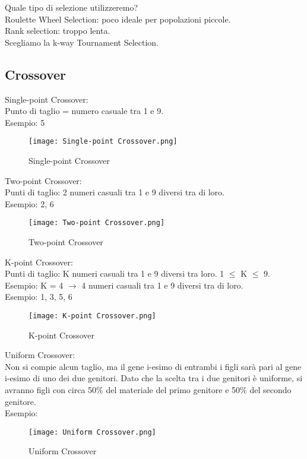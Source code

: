 \documentclass[10pt,a4paper]{article}
\begin{document}
    Quale tipo di selezione utilizzeremo?\\
    Roulette Wheel Selection: poco ideale per popolazioni piccole.\\
    Rank selection: troppo lenta.\\
    Scegliamo la k-way Tournament Selection.\\
    
    \subsection{Crossover}
    \label{Crossover}
    Single-point Crossover:\\
    Punto di taglio  = numero casuale tra 1 e 9.\\
    Esempio: 5
    \begin{figure}[h!]
      \centering
      \caption{Single-point Crossover}
      \texttt{[image: Single-point Crossover.png]}
      \label{Single-pointCrossover}
    \end{figure}
    
    
    Two-point Crossover:\\
    Punti di taglio: 2 numeri casuali tra 1 e 9 diversi tra di loro.\\
    Esempio: 2, 6
    \begin{figure}[h!]
      \centering
      \caption{Two-point Crossover}
      \texttt{[image: Two-point Crossover.png]}
      \label{Two-pointCrossover}
    \end{figure}
    
    \newpage
    
    K-point Crossover:\\
    Punti di taglio: K numeri casuali tra 1 e 9 diversi tra loro. 1 $\leq$ K $\leq$ 9.\\
    Esempio: K = 4 $\rightarrow$ 4 numeri casuali tra 1 e 9 diversi tra di loro.\\
    Esempio: 1, 3, 5, 6
    \begin{figure}[h!]
      \centering
      \caption{K-point Crossover}
      \texttt{[image: K-point Crossover.png]}
      \label{K-pointCrossover}
    \end{figure}
    
    Uniform Crossover:\\
    Non si compie alcun taglio, ma il gene i-esimo di entrambi i figli sarà pari al gene i-esimo di uno 
    dei due genitori. Dato che la scelta tra i due genitori è uniforme, si avranno figli 
    con circa 50\% del materiale del primo genitore e 50\% del secondo genitore.\\
    Esempio:
    \begin{figure}[h!]
      \centering
      \caption{Uniform Crossover}
      \texttt{[image: Uniform Crossover.png]}
      \label{UniformCrossover}
    \end{figure}
    
\end{document}
